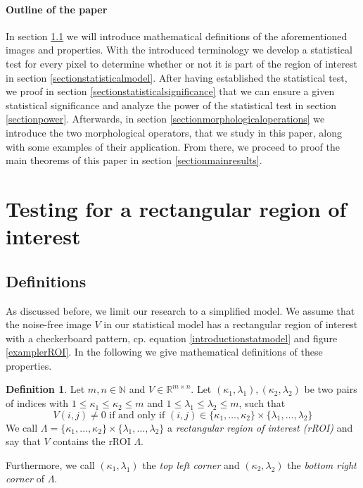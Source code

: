 \documentclass[a4paper,12pt]{article}
\theoremstyle{plain}
\theoremstyle{definition}
\newtheorem{definition}[theorem]{Definition}
\begin{document}
\paragraph{Outline of the paper}

In section \ref{sectiondefinitions} we will introduce mathematical definitions of the aforementioned images and properties. With the introduced terminology we develop a statistical test for every pixel to determine whether or not it is part of the region of interest in section \ref{sectionstatisticalmodel}. After having established the statistical test, we proof in section \ref{sectionstatisticalsignificance} that we can ensure a given statistical significance and analyze the power of the statistical test in section \ref{sectionpower}. Afterwards, in section \ref{sectionmorphologicaloperations} we introduce the two morphological operators, that we study in this paper, along with some examples of their application. From there, we proceed to proof the main theorems of this paper in section \ref{sectionmainresults}.

\newpage

\section{Testing for a rectangular region of interest}

\subsection{Definitions}\label{sectiondefinitions}

As discussed before, we limit our research to a simplified model. We assume that the noise-free image $V$ in our statistical model has a rectangular region of interest with a checkerboard pattern, cp. equation \eqref{introductionstatmodel} and figure \ref{examplerROI}. In the following we give mathematical definitions of these properties.

\begin{definition}
	Let $m, n \in \mathbb{N}$ and $V \in \mathbb{R}^{m \times n}$. Let $(\kappa_1, \lambda_1), (\kappa_2, \lambda_2)$ be two pairs of indices with $1 \leq \kappa_1 \leq \kappa_2 \leq m$ and $1 \leq \lambda_1 \leq \lambda_2 \leq m$, such that
	\begin{equation}\label{eqrROI}
		V(i, j) \neq 0 \textrm{ if and only if } (i, j) \in \{ \kappa_1, \dots, \kappa_2 \} \times \{ \lambda_1, \dots, \lambda_2 \}
	\end{equation}
	We call $\varLambda = \{ \kappa_1, \dots, \kappa_2 \} \times \{ \lambda_1, \dots, \lambda_2 \}$ a \emph{rectangular region of interest (rROI)} and say that $V$ contains the rROI $\varLambda$.
	
	Furthermore, we call $(\kappa_1, \lambda_1)$ the \emph{top left corner} and $(\kappa_2, \lambda_2)$ the \emph{bottom right corner} of $\varLambda$.
\end{definition}
\end{document}
